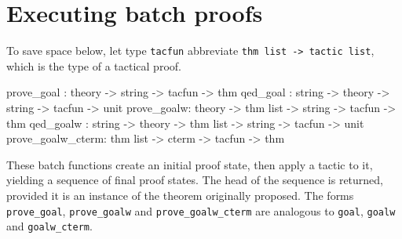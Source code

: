 \section{Executing batch proofs}
%
To save space below, let type \texttt{tacfun} abbreviate \texttt{thm list ->
  tactic list}, which is the type of a tactical proof.
\begin{ttbox}
prove_goal :           theory ->             string -> tacfun -> thm
qed_goal   : string -> theory ->             string -> tacfun -> unit
prove_goalw:           theory -> thm list -> string -> tacfun -> thm
qed_goalw  : string -> theory -> thm list -> string -> tacfun -> unit
prove_goalw_cterm:               thm list -> cterm  -> tacfun -> thm
\end{ttbox}
These batch functions create an initial proof state, then apply a tactic to
it, yielding a sequence of final proof states.  The head of the sequence is
returned, provided it is an instance of the theorem originally proposed.
The forms \texttt{prove_goal}, \texttt{prove_goalw} and \texttt{prove_goalw_cterm}
are analogous to \texttt{goal}, \texttt{goalw} and \texttt{goalw_cterm}.

